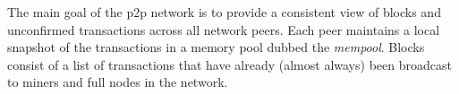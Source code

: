 
The main goal of the p2p network is to provide a consistent
view of blocks and unconfirmed transactions across all network peers.
Each peer maintains a local snapshot of the transactions in a memory
pool dubbed the \emph{mempool}. Blocks consist of a list of
transactions that have already (almost always) been broadcast to
miners and full nodes in the network.


%
